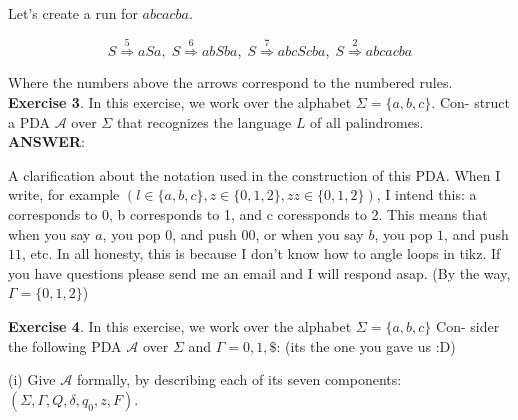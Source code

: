 \documentclass{article}
\begin{document}
Let's create a run for $abcacba$.

\[S\overset{5}\Rightarrow aSa, \; S\overset{6}\Rightarrow abSba, \;  S\overset{7}\Rightarrow abcScba, \;  S\overset{2}\Rightarrow abcacba\]

Where the numbers above the arrows correspond to the numbered rules. \\

\textbf{Exercise 3}. In this exercise, we work over the alphabet $\Sigma = \{a, b, c\}$. Con-
struct a PDA $\mathcal{A}$ over $\Sigma$ that recognizes the language $L$ of all palindromes.\\

\textbf{ANSWER}:

A clarification about the notation used in the construction of this PDA. When I write, for example $(l \in \{a, b, c\}, z \in \{0, 1, 2\}, zz \in \{0, 1, 2\})$, I intend this: a corresponds to 0, b corresponds to 1, and c coressponds to 2. This means that when you say $a$, you pop $0$, and push $00$, or when you say $b$, you pop $1$, and push $11$, etc. In all honesty, this is because I don't know how to angle loops in tikz. If you have questions please send me an email and I will respond asap. (By the way, $\Gamma = \{0, 1, 2\}$)
\begin{center}
\end{center}

\textbf{Exercise 4}. In this exercise, we work over the alphabet $\Sigma = \{a, b, c\}$ Con-
sider the following PDA $\mathcal{A}$ over $\Sigma$ and $\Gamma = {0, 1, \$}$: (its the one you gave us :D)

(i) Give $\mathcal{A}$ formally, by describing each of its seven components: $(\Sigma, \Gamma, Q, \delta, q_0, z, F)$.
\end{document}
